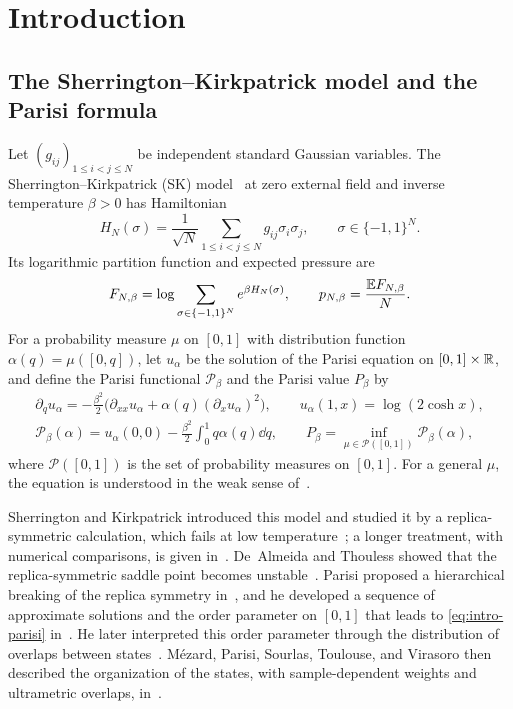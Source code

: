 \chapter{Introduction}\label{sec:introduction}

\section{The Sherrington--Kirkpatrick model and the Parisi formula}\label{sec:intro-background}

Let $(g_{ij})_{1\le i<j\le N}$ be independent standard Gaussian
variables. The Sherrington--Kirkpatrick (SK)
model~\cite{SherringtonKirkpatrick1975} at zero external field and
inverse temperature $\beta>0$ has Hamiltonian
\[
 H_N(\sigma)=\frac1{\sqrt N}\sum_{1\le i<j\le N}g_{ij}\sigma_i\sigma_j,
 \qquad \sigma\in\{-1,1\}^N.
\]
Its logarithmic partition function and expected pressure are
\[
 F_{N,\beta}=\log\sum_{\sigma\in\{-1,1\}^N}e^{\beta H_N(\sigma)},
 \qquad
 p_{N,\beta}=\frac{\mathbb E F_{N,\beta}}N.
\]
For a probability measure $\mu$ on $[0,1]$ with distribution function
$\alpha(q)=\mu([0,q])$, let $u_\alpha$ be the solution of the Parisi
equation on $[0,1]\times\mathbb R$, and define the Parisi functional
$\mathcal P_\beta$ and the Parisi value $P_\beta$ by
\begin{equation}\label{eq:intro-parisi}
\begin{gathered}
 \partial_qu_\alpha=-\frac{\beta^2}{2}
 \bigl(\partial_{xx}u_\alpha+\alpha(q)(\partial_xu_\alpha)^2\bigr),
 \qquad u_\alpha(1,x)=\log(2\cosh x),\\
 \mathcal P_\beta(\alpha)=u_\alpha(0,0)
       -\frac{\beta^2}{2}\int_0^1q\alpha(q)\dd q,
 \qquad P_\beta=\inf_{\mu\in\mathcal P([0,1])}\mathcal P_\beta(\alpha),
\end{gathered}
\end{equation}
where $\mathcal P([0,1])$ is the set of probability measures on
$[0,1]$. For a general $\mu$, the equation is understood in the weak
sense of~\cite[Theorem~4]{JagannathTobasco2016}.

Sherrington and Kirkpatrick introduced this model and studied it by a
replica-symmetric calculation, which fails at low
temperature~\cite{SherringtonKirkpatrick1975}; a longer treatment, with
numerical comparisons, is given in~\cite{KirkpatrickSherrington1978}.
De~Almeida and Thouless showed that the replica-symmetric saddle point
becomes unstable~\cite{deAlmeidaThouless1978}. Parisi proposed a
hierarchical breaking of the replica symmetry in~\cite{Parisi1979}, and
he developed a sequence of approximate solutions and the order
parameter on $[0,1]$ that leads to \eqref{eq:intro-parisi}
in~\cite{Parisi1980Sequence,Parisi1980OrderParameter}. He later
interpreted this order parameter through the distribution of overlaps
between states~\cite{Parisi1983OrderParameter}. M\'ezard, Parisi,
Sourlas, Toulouse, and Virasoro then described the organization of the
states, with sample-dependent weights and ultrametric overlaps,
in~\cite{MezardEtAl1984Nature}.

